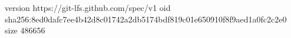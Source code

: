 version https://git-lfs.github.com/spec/v1
oid sha256:8ed0dafc7ee4b42d8c01742a2db5174bdf819c01e650910f8f9aed1a0fc2c2e0
size 486656
